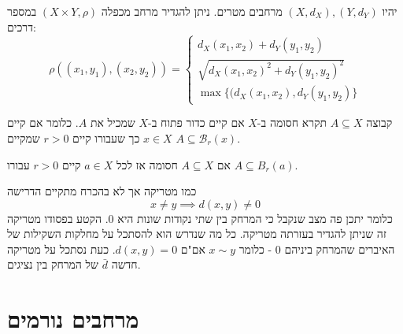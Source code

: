 \documentclass{tstextbook}
\begin{document}
\begin{definition}
יהיו \((X,d_{X}),\left( Y,d_{Y} \right)\) מרחבים מטרים. ניתן להגדיר מרחב מכפלה \(\left( X\times Y,\rho \right)\) במספר דרכים: 
$$\rho((x_{1},y_{1}),(x_{2},y_{2}))=\begin{cases}d_{X}(x_{1},x_{2})+d_{Y}(y_{1},y_{2}) \\\sqrt{d_{X}(x_{1},x_{2})^{2}+d_{Y}(y_{1},y_{2})^{2}} \\\max\{(d_{X}(x_{1},x_{2}),d_{Y}(y_{1},y_{2})\}
\end{cases}$$

\end{definition}
\begin{definition}
קבוצה \(A\subseteq X\) תקרא חסומה ב-\(X\) אם קיים כדור פתוח ב-\(X\) שמכיל את \(A\). כלומר אם קיים \(x \in X\) כך שעבורו קיים \(r>0\) שמקיים \(A\subseteq \mathcal{B}_{r}(x)\).

\end{definition}
\begin{lemma}
אם \(A\subseteq X\) חסומה אז לכל \(a\in X\) קיים \(r>0\) עבורו \(A\subseteq B_{r}(a)\). 

\end{lemma}
\begin{definition}
כמו מטריקה אך לא בהכרח מתקיים הדרישה
$$x\neq y\implies d(x,y)\neq 0$$
כלומר יתכן פה מצב שנקבל כי המרחק בין שתי נקודות שונות היא 0. 
הקטע בפסודו מטריקה זה שניתן להגדיר בעזרתה מטריקה. כל מה שנדרש הוא להסתכל על מחלקות השקילות של האיברים שהמרחק ביניהם 0 - כלומר \(x\sim y\) אם"ם \(d(x,y)=0\).
כעת נסתכל על מטריקה חדשה \(\bar{d}\) של המרחק בין נציגים.

\end{definition}
\section{מרחבים נורמים}
\end{document}
